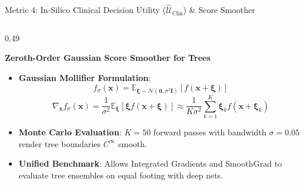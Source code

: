 \documentclass[aspectratio=169,10pt]{beamer}
\begin{document}
\begin{frame}{Metric 4: In-Silico Clinical Decision Utility ($\widehat{\mathcal{U}}_{\text{Clin}}$) \& Score Smoother}
\begin{columns}[t]
\begin{column}{0.49\textwidth}
\begin{exampleblock}{\textbf{Zeroth-Order Gaussian Score Smoother for Trees}}
\begin{itemize}
          \item \textbf{Gaussian Mollifier Formulation}:
          $$f_\sigma(\mathbf{x}) = \mathbb{E}_{\boldsymbol{\xi} \sim \mathcal{N}(\mathbf{0}, \sigma^2 \mathbf{I})} [ f(\mathbf{x} + \boldsymbol{\xi}) ]$$
          $$\nabla_\mathbf{x} f_\sigma(\mathbf{x}) = \frac{1}{\sigma^2} \mathbb{E}_{\boldsymbol{\xi}} [ \boldsymbol{\xi} f(\mathbf{x} + \boldsymbol{\xi}) ] \approx \frac{1}{K \sigma^2} \sum_{k=1}^{K} \boldsymbol{\xi}_k f(\mathbf{x} + \boldsymbol{\xi}_k)$$
          \item \textbf{Monte Carlo Evaluation}: $K = 50$ forward passes with bandwidth $\sigma = 0.05$ render tree boundaries $C^\infty$ smooth.
          \item \textbf{Unified Benchmark}: Allows Integrated Gradients and SmoothGrad to evaluate tree ensembles on equal footing with deep nets.
        \end{itemize}
      \end{exampleblock}
    \end{column}
  \end{columns}
\end{frame}
\end{document}

